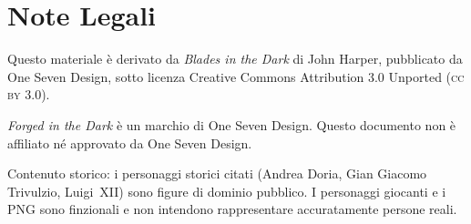 \documentclass[11pt, a4paper, twoside]{book}
\begin{document}












\backmatter
\printindex

\chapter*{Note Legali}

Questo materiale è derivato da \textit{Blades in the Dark} di John Harper,
pubblicato da One Seven Design, sotto licenza Creative Commons Attribution
3.0 Unported (\textsc{cc by 3.0}).

\textit{Forged in the Dark} è un marchio di One Seven Design.
Questo documento non è affiliato né approvato da One Seven Design.

Contenuto storico: i personaggi storici citati (Andrea Doria, Gian Giacomo
Trivulzio, Luigi~XII) sono figure di dominio pubblico. I personaggi giocanti
e i PNG sono finzionali e non intendono rappresentare accuratamente persone
reali.



%

%

%

%
\end{document}
